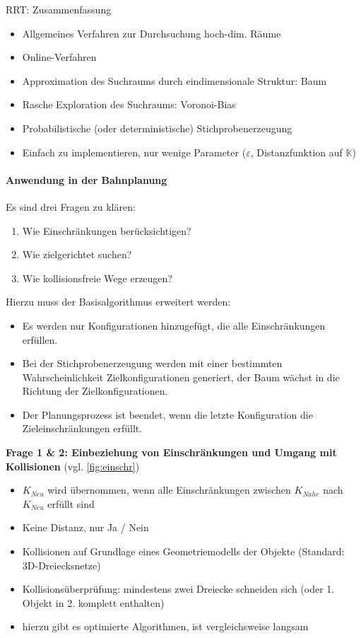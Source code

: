 RRT: Zusammenfassung
\begin{itemize}
\item Allgemeines Verfahren zur Durchsuchung hoch-dim. Räume
\item Online-Verfahren
\item Approximation des Suchraums durch eindimensionale Struktur: Baum
\item Rasche Exploration des Suchraums: Voronoi-Bias
\item Probabilistische (oder deterministische) Stichprobenerzeugung
\item Einfach zu implementieren, nur wenige Parameter ($\varepsilon$, Distanzfunktion auf $\mathbb{K}$)
\end{itemize}
\newpage
\paragraph{Anwendung in der Bahnplanung} Es sind drei Fragen zu klären:
\begin{enumerate}
\item Wie Einschränkungen berücksichtigen?
\item Wie zielgerichtet suchen?
\item Wie kollisionsfreie Wege erzeugen?
\end{enumerate}
Hierzu muss der Basisalgorithmus erweitert werden:
\begin{itemize}
\item Es werden nur Konfigurationen hinzugefügt, die alle Einschränkungen erfüllen.
\item Bei der Stichprobenerzeugung werden mit einer bestimmten Wahrscheinlichkeit Zielkonfigurationen generiert, der Baum wächst in die Richtung der Zielkonfigurationen.
\item Der Planungsprozess ist beendet, wenn die letzte Konfiguration die Zieleinschränkungen erfüllt.
\end{itemize} 
\textbf{Frage 1 \& 2: Einbeziehung von Einschränkungen und Umgang mit Kollisionen} (vgl. \autoref{fig:einschr})
\begin{itemize}
\item $K_{Neu}$ wird übernommen, wenn alle Einschränkungen zwischen $K_{Nahe}$ nach $K_{Neu}$ erfüllt sind
\item Keine Distanz, nur Ja / Nein
\item Kollisionen auf Grundlage eines Geometriemodells der Objekte (Standard: 3D-Dreiecksnetze)
\item Kollisionsüberprüfung: mindestens zwei Dreiecke schneiden sich (oder 1. Objekt in 2. komplett enthalten)
\item hierzu gibt es optimierte Algorithmen, ist vergleichsweise langsam
\end{itemize}
